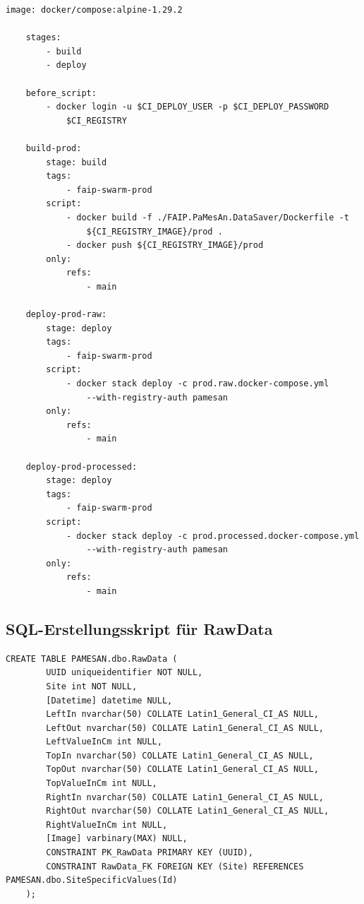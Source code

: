 \begin{lstlisting}[language=gitlab-ci-cd,
    caption={.gitlab-ci.yml-Datei für \ac{CI/CD}},
    breaklines=true,
    label={appendix:lst:gitlab-ci}]
    image: docker/compose:alpine-1.29.2

    stages:
        - build
        - deploy

    before_script:
        - docker login -u $CI_DEPLOY_USER -p $CI_DEPLOY_PASSWORD
            $CI_REGISTRY

    build-prod:
        stage: build
        tags:
            - faip-swarm-prod
        script:
            - docker build -f ./FAIP.PaMesAn.DataSaver/Dockerfile -t 
                ${CI_REGISTRY_IMAGE}/prod .
            - docker push ${CI_REGISTRY_IMAGE}/prod
        only:
            refs:
                - main

    deploy-prod-raw:
        stage: deploy
        tags:
            - faip-swarm-prod
        script:
            - docker stack deploy -c prod.raw.docker-compose.yml 
                --with-registry-auth pamesan
        only:
            refs:
                - main

    deploy-prod-processed:
        stage: deploy
        tags:
            - faip-swarm-prod
        script:
            - docker stack deploy -c prod.processed.docker-compose.yml 
                --with-registry-auth pamesan
        only:
            refs:
                - main
\end{lstlisting}


\subsection{SQL-Erstellungsskript für RawData}

\begin{lstlisting}[style=sql-style,
    caption={SQL-Skript für RawData},
    breaklines=true,
    label={appendix:lst:sql_raw}]
    CREATE TABLE PAMESAN.dbo.RawData (
        UUID uniqueidentifier NOT NULL,
        Site int NOT NULL,
        [Datetime] datetime NULL,
        LeftIn nvarchar(50) COLLATE Latin1_General_CI_AS NULL,
        LeftOut nvarchar(50) COLLATE Latin1_General_CI_AS NULL,
        LeftValueInCm int NULL,
        TopIn nvarchar(50) COLLATE Latin1_General_CI_AS NULL,
        TopOut nvarchar(50) COLLATE Latin1_General_CI_AS NULL,
        TopValueInCm int NULL,
        RightIn nvarchar(50) COLLATE Latin1_General_CI_AS NULL,
        RightOut nvarchar(50) COLLATE Latin1_General_CI_AS NULL,
        RightValueInCm int NULL,
        [Image] varbinary(MAX) NULL,
        CONSTRAINT PK_RawData PRIMARY KEY (UUID),
        CONSTRAINT RawData_FK FOREIGN KEY (Site) REFERENCES PAMESAN.dbo.SiteSpecificValues(Id)
    );
\end{lstlisting}







